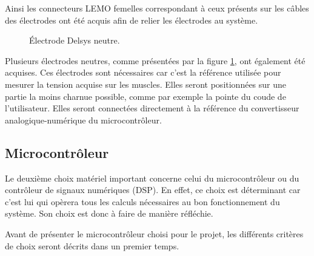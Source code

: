 \documentclass[letterpaper, twoside, 12pt, memoire, creativecommons, hyperref]{thETS}
\begin{document}
Ainsi les connecteurs LEMO femelles correspondant à ceux présents sur les câbles des électrodes ont été acquis afin de relier les électrodes au système.

\begin{figure}
	\centering
	\caption{Électrode Delsys neutre.}
	\label{fig:delsysneutre}
\end{figure}

Plusieurs électrodes neutres, comme présentées par la figure \ref{fig:delsysneutre}, ont également été acquises. Ces électrodes sont nécessaires car c'est la référence utilisée pour mesurer la tension acquise sur les muscles. Elles seront positionnées sur une partie la moins charnue possible, comme par exemple la pointe du coude de l'utilisateur. Elles seront connectées directement à la référence du convertisseur analogique-numérique du microcontrôleur.

\subsection{Microcontrôleur}\label{ch:microcon}

Le deuxième choix matériel important concerne celui du microcontrôleur ou du contrôleur de signaux numériques (DSP). En effet, ce choix est déterminant car c'est lui qui opèrera tous les calculs nécessaires au bon fonctionnement du système. Son choix est donc à faire de manière réfléchie. 

Avant de présenter le microcontrôleur choisi pour le projet, les différents critères de choix seront décrits dans un premier temps. 
\end{document}

